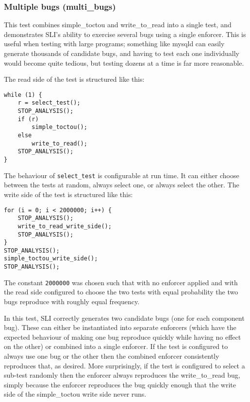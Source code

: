 \subsubsection{Multiple bugs (multi\_bugs)}

This test combines simple\_toctou and write\_to\_read into a single
test, and demonstrates SLI's ability to exercise several bugs using a
single enforcer.  This is useful when testing with large programs;
something like mysqld can easily generate thousands of candidate bugs,
and having to test each one individually would become quite tedious,
but testing dozens at a time is far more reasonable.

The read side of the test is structured like this:

\begin{verbatim}
while (1) {
    r = select_test();
    STOP_ANALYSIS();
    if (r)
        simple_toctou();
    else
        write_to_read();
    STOP_ANALYSIS();
}
\end{verbatim}

The behaviour of \verb|select_test| is configurable at run time.  It
can either choose between the tests at random, always select one, or
always select the other.  The write side of the test is structured
like this:

\begin{verbatim}
for (i = 0; i < 2000000; i++) {
    STOP_ANALYSIS();
    write_to_read_write_side();
    STOP_ANALYSIS();
}
STOP_ANALYSIS();
simple_toctou_write_side();
STOP_ANALYSIS();
\end{verbatim}

The constant \verb|2000000| was chosen such that with no enforcer
applied and with the read side configured to choose the two tests with
equal probability the two bugs reproduce with roughly equal frequency.

In this test, SLI correctly generates two candidate bugs (one for each
component bug).  These can either be instantiated into separate
enforcers (which have the expected behaviour of making one bug
reproduce quickly while having no effect on the other) or combined
into a single enforcer.  If the test is configured to always use one
bug or the other then the combined enforcer consistently reproduces
that, as desired.  More surprisingly, if the test is configured to
select a sub-test randomly then the enforcer always reproduces the
write\_to\_read bug, simply because the enforcer reproduces the bug
quickly enough that the write side of the simple\_toctou write side
never runs.


